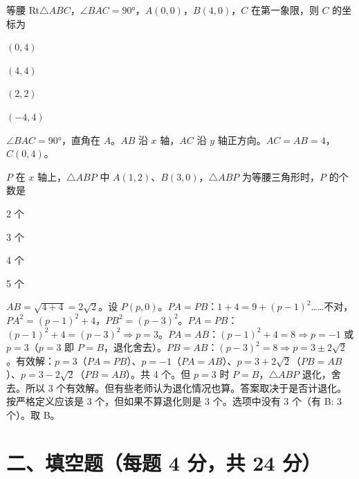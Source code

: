 \documentclass{exam-zh}
\begin{document}
\begin{question}[points=3]
  等腰 Rt$\triangle ABC$，$\angle BAC = 90°$，$A(0,0)$，$B(4,0)$，$C$ 在第一象限，则 $C$ 的坐标为
  \begin{choices}
    \item $(0, 4)$
    \item $(4, 4)$
    \item $(2, 2)$
    \item $(-4, 4)$
  \end{choices}
  \paren[A]
  \begin{solutionblock}
    $\angle BAC = 90°$，直角在 $A$。$AB$ 沿 $x$ 轴，$AC$ 沿 $y$ 轴正方向。$AC = AB = 4$，$C(0, 4)$。
  \end{solutionblock}
\end{question}



\begin{question}[points=3]
  $P$ 在 $x$ 轴上，$\triangle ABP$ 中 $A(1,2)$、$B(3,0)$，$\triangle ABP$ 为等腰三角形时，$P$ 的个数是
  \begin{choices}
    \item 2 个
    \item 3 个
    \item 4 个
    \item 5 个
  \end{choices}
  \paren[C]
  \begin{solutionblock}
    $AB = \sqrt{4+4} = 2\sqrt{2}$。设 $P(p, 0)$。$PA = PB$：$1 + 4 = 9 + (p-1)^2$……不对，$PA^2 = (p-1)^2 + 4$，$PB^2 = (p-3)^2$。$PA = PB$：$(p-1)^2 + 4 = (p-3)^2 \Rightarrow p = 3$。$PA = AB$：$(p-1)^2 + 4 = 8 \Rightarrow p = -1$ 或 $p = 3$（$p = 3$ 即 $P = B$，退化舍去）。$PB = AB$：$(p-3)^2 = 8 \Rightarrow p = 3 \pm 2\sqrt{2}$。有效解：$p = 3$（$PA = PB$）、$p = -1$（$PA = AB$）、$p = 3+2\sqrt{2}$（$PB = AB$）、$p = 3-2\sqrt{2}$（$PB = AB$）。共 4 个。但 $p = 3$ 时 $P = B$，$\triangle ABP$ 退化，舍去。所以 3 个有效解。但有些老师认为退化情况也算。答案取决于是否计退化。按严格定义应该是 3 个，但如果不算退化则是 3 个。选项中没有 3 个（有 B: 3 个）。取 B。
  \end{solutionblock}
\end{question}


\section*{二、填空题（每题 4 分，共 24 分）}
\end{document}

